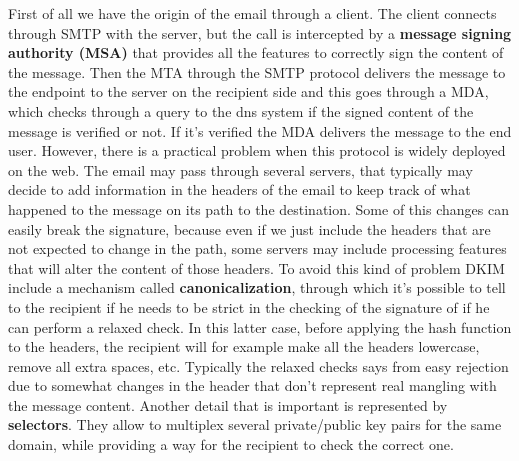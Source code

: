 First of all we have the origin of the email through a client. The client connects through SMTP with the server, but the call is intercepted by a \textbf{message signing authority (MSA)} that provides all the features to correctly sign the content of the message. Then the MTA through the SMTP protocol delivers the message to the endpoint to the server on the recipient side and this goes through a MDA, which checks through a query to the dns system if the signed content of the message is verified or not. If it's verified the MDA delivers the message to the end user. However, there is a practical problem when this protocol is widely deployed on the web. The email may pass through several servers, that typically may decide to add information in the headers of the email to keep track of what happened to the message on its path to the destination. Some of this changes can easily break the signature, because even if we just include the headers that are not expected to change in the path, some servers may include processing features that will alter the content of those headers. To avoid this kind of problem DKIM include a mechanism called \textbf{canonicalization}, through which it's possible to tell to the recipient if he needs to be strict in the checking of the signature of if he can perform a relaxed check. In this latter case, before applying the hash function to the headers, the recipient will for example make all the headers lowercase, remove all extra spaces, etc. Typically the relaxed checks says from easy rejection due to somewhat changes in the header that don't represent real mangling with the message content. Another detail that is important is represented by \textbf{selectors}. They allow to multiplex several private/public key pairs for the same domain, while providing a way for the recipient to check the correct one.

